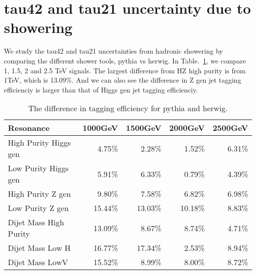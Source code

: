\newpage



\section{tau42 and tau21 uncertainty due to showering}

We study the tau42 and tau21 uncertainties from hadronic showering by comparing the different shower tools,
pythia vs herwig. In Table.~\ref{table:Difference}, we compare 1, 1.5, 2 and 2.5 TeV signals. The largest difference from HZ high
purity is from 1TeV, which is 13.09\%. And we can also see the difference in Z gen jet tagging efficienciy is larger than that of Higgs gen 
jet tagging efficienciy. 


\begin{table}[htbp]
\begin{tabular}{|l|r|r|r|r|}
\hline
Resonance & \multicolumn{1}{l|}{1000GeV} & \multicolumn{1}{l|}{1500GeV} & \multicolumn{1}{l|}{2000GeV} & \multicolumn{1}{l|}{2500GeV} \\ \hline
High Purity Higgs gen & 4.75\% & 2.28\% & 1.52\% & 6.31\% \\ \hline
Low Purity Higgs gen & 5.91\% & 6.33\% & 0.79\% & 4.39\% \\ \hline
High Purity Z gen & 9.80\% & 7.58\% & 6.82\% & 6.98\% \\ \hline
Low Purity Z gen & 15.44\% & 13.03\% & 10.18\% & 8.83\% \\ \hline
Dijet Mass High Purity & 13.09\% & 8.67\% & 8.74\% & 4.71\% \\ \hline
Dijet Mass Low H & 16.77\% & 17.34\% & 2.53\% & 8.94\% \\ \hline
Dijet Mass LowV & 15.52\% & 8.99\% & 8.00\% & 8.72\% \\ \hline
\end{tabular}
\caption{The difference in tagging efficiency for pythia and herwig.}
\label{table:Difference}
\end{table}



\clearpage
